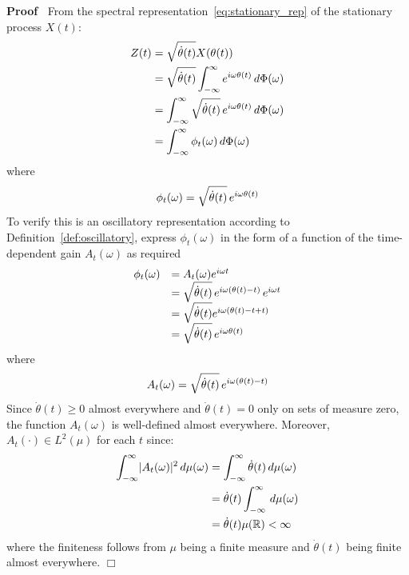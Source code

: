 \documentclass{article}
\newcommand{\cdummy}{\cdot}
\newenvironment{proof}{\noindent\textbf{Proof\ }}{\hspace*{\fill}$\Box$\medskip}
\begin{document}
\begin{proof}
From the spectral representation~\eqref{eq:stationary_rep} of the stationary
process $X (t)$:
\begin{align}
Z (t) & = \sqrt{\dot{\theta} (t)} X (\theta (t)) \\
& = \sqrt{\dot{\theta} (t)} \int_{- \infty}^{\infty} e^{i \omega \theta
(t)} \hspace{0.17em} d \Phi (\omega) \\
& = \int_{- \infty}^{\infty} \sqrt{\dot{\theta} (t)} \hspace{0.17em} e^{i \omega \theta (t)} \hspace{0.17em} d \Phi (\omega) \\
& = \int_{- \infty}^{\infty} \phi_t (\omega) \hspace{0.17em} d \Phi
(\omega)
\end{align}
where
\begin{equation}
\phi_t (\omega) = \sqrt{\dot{\theta} (t)} \hspace{0.17em} e^{i \omega
\theta (t)}
\end{equation}
To verify this is an oscillatory representation according to
Definition~\ref{def:oscillatory}, express $\phi_t (\omega)$ in the form of a
function of the time-dependent gain $A_t (\omega)$ as required
\begin{equation}
\begin{array}{ll}
\phi_t (\omega) & = A_t (\omega) e^{i \omega t}\\
& = \sqrt{\dot{\theta} (t)} \hspace{0.17em} e^{i \omega (\theta (t) -
t)} \hspace{0.17em} e^{i \omega t}\\
& = \sqrt{\dot{\theta} (t)} e^{i \omega (\theta (t) - t + t)}\\
& = \sqrt{\dot{\theta} (t)} \hspace{0.17em} e^{i \omega \theta (t)}
\end{array}
\end{equation}
where
\begin{equation}
A_t (\omega) = \sqrt{\dot{\theta} (t)} \hspace{0.17em} e^{i \omega
(\theta (t) - t)}
\end{equation}
Since $\dot{\theta} (t) \geq 0$ almost everywhere and $\dot{\theta} (t) = 0$
only on sets of measure zero, the function $A_t (\omega)$ is well-defined
almost everywhere. Moreover, $A_t (\cdummy) \in L^2 (\mu)$ for each $t$
since:
\begin{align}
\int_{- \infty}^{\infty} \lvert A_t (\omega) \rvert^2 \hspace{0.17em} d
\mu (\omega) & = \int_{- \infty}^{\infty} \dot{\theta} (t)
\hspace{0.17em} d \mu (\omega) \\
& = \dot{\theta} (t) \int_{- \infty}^{\infty} \hspace{0.17em} d \mu
(\omega) \\
& = \dot{\theta} (t) \mu (\mathbb{R}) < \infty
\end{align}
where the finiteness follows from $\mu$ being a finite measure and
$\dot{\theta} (t)$ being finite almost everywhere.
\end{proof}
\end{document}
